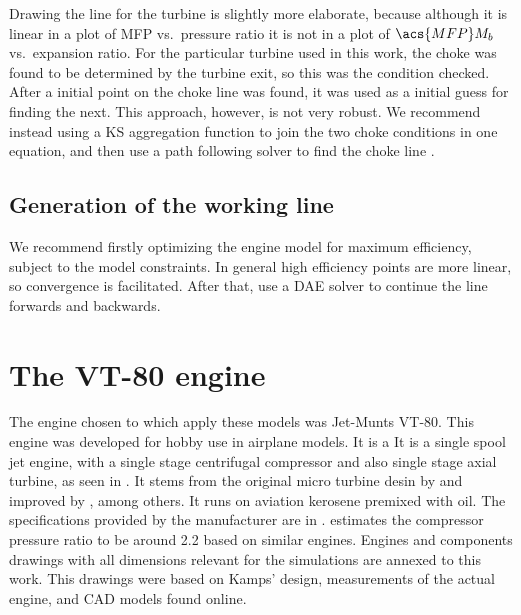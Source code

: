 Drawing the line for the turbine is slightly more elaborate, because although it is linear in a plot of \acs{MFP} vs.\ pressure ratio it is not in a plot of $\acs{MFP}M_b$ vs.\ expansion ratio.
For the particular turbine used in this work, the choke was found to be determined by the turbine exit, so this was the condition checked. After a initial point on the choke line was found, it was used as a initial guess for finding the next. This approach, however, is not very robust. We recommend instead using a KS aggregation function to join the two choke conditions in one equation, and then use a path following solver to find the choke line \cite{martins}.

\subsection{Generation of the working line}
We recommend firstly optimizing the engine model for maximum efficiency, subject to the model constraints. In general high efficiency points are more linear, so convergence is facilitated.
After that, use a \ac{DAE} solver to continue the line forwards and backwards.

\section{The VT-80 engine}
The engine chosen to which apply these models was Jet-Munts VT-80.
This engine was developed for hobby use in airplane models. It is a 
It is a single spool jet engine, with a single stage centrifugal compressor 
 and also single stage axial turbine, as seen in . It stems from the original micro turbine desin by \textcite{Schreckling1994} and improved by \textcite{Kamps1999}, among others. 
It runs on aviation kerosene premixed with oil.
The specifications provided by the manufacturer are in .
\textcite{bolsoni} estimates the compressor pressure ratio 
to be around 2.2 based on similar engines. Engines and components drawings with all dimensions relevant for the simulations are annexed to this work. This drawings were based on Kamps' design, measurements of the actual engine, and CAD models found online.

